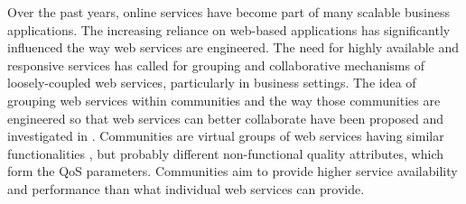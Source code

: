 Over the past years, online services have become part of many
scalable business applications. The increasing reliance on
web-based applications has significantly influenced the way web
services are engineered. 
The need for highly available and responsive services has called
for grouping and collaborative mechanisms of loosely-coupled web
services, particularly in business settings. The idea of grouping
web services within communities and the way those communities are
engineered so that web services can better collaborate have been
proposed and investigated in
\cite{DBLP:journals/ijebr/MaamarSTBB09,DBLP:journals/internet/BenatallahSD03,Rosario:2008:PQS:1512146.1512290}.
Communities are virtual groups of web services having similar
functionalities \cite{Zeng:2003:QDW:775152.775211,
Paik:2005:TSS:2229263.2230038,Medjahed05adynamic,10.1109/ARES.2008.7},
but probably different non-functional quality attributes, which
form the QoS parameters. 
Communities aim to provide higher service
availability and performance than what individual web services can
provide. 


